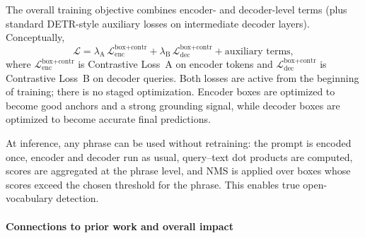 \begin{enrichment}
\begin{enrichment}[Method][subsection]
		The overall training objective combines encoder- and decoder-level terms (plus standard DETR-style auxiliary losses on intermediate decoder layers). Conceptually,
		\[
		\mathcal{L}
		= \lambda_{\text{A}}\, \mathcal{L}_{\text{enc}}^{\text{box+contr}}
		+ \lambda_{\text{B}}\, \mathcal{L}_{\text{dec}}^{\text{box+contr}}
		+ \text{auxiliary terms},
		\]
		where \(\mathcal{L}_{\text{enc}}^{\text{box+contr}}\) is Contrastive Loss~A on encoder tokens and \(\mathcal{L}_{\text{dec}}^{\text{box+contr}}\) is Contrastive Loss~B on decoder queries. Both losses are active from the beginning of training; there is no staged optimization. Encoder boxes are optimized to become good anchors and a strong grounding signal, while decoder boxes are optimized to become accurate final predictions.
		
		At inference, any phrase can be used without retraining: the prompt is encoded once, encoder and decoder run as usual, query–text dot products are computed, scores are aggregated at the phrase level, and NMS is applied over boxes whose scores exceed the chosen threshold for the phrase. This enables true open-vocabulary detection.
		
		\paragraph{Connections to prior work and overall impact}
		

\end{enrichment}
\end{enrichment}
